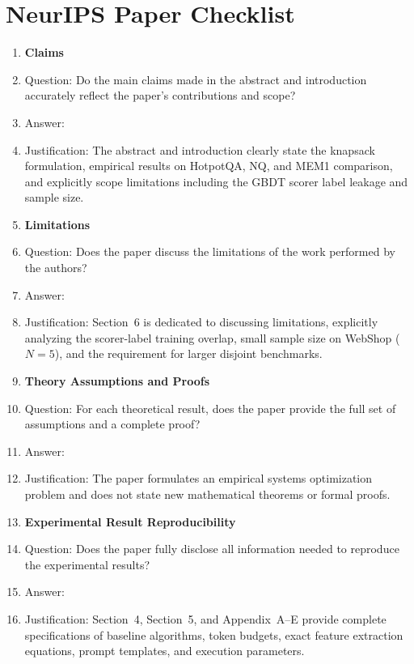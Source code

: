 \section*{NeurIPS Paper Checklist}

\begin{enumerate}

\item {\bf Claims}
    \item[] Question: Do the main claims made in the abstract and introduction accurately reflect the paper's contributions and scope?
    \item[] Answer: \answerYes{}
    \item[] Justification: The abstract and introduction clearly state the knapsack formulation, empirical results on HotpotQA, NQ, and MEM1 comparison, and explicitly scope limitations including the GBDT scorer label leakage and sample size.

\item {\bf Limitations}
    \item[] Question: Does the paper discuss the limitations of the work performed by the authors?
    \item[] Answer: \answerYes{}
    \item[] Justification: Section~6 is dedicated to discussing limitations, explicitly analyzing the scorer-label training overlap, small sample size on WebShop ($N=5$), and the requirement for larger disjoint benchmarks.

\item {\bf Theory Assumptions and Proofs}
    \item[] Question: For each theoretical result, does the paper provide the full set of assumptions and a complete proof?
    \item[] Answer: \answerNA{}
    \item[] Justification: The paper formulates an empirical systems optimization problem and does not state new mathematical theorems or formal proofs.

\item {\bf Experimental Result Reproducibility}
    \item[] Question: Does the paper fully disclose all information needed to reproduce the experimental results?
    \item[] Answer: \answerYes{}
    \item[] Justification: Section~4, Section~5, and Appendix~A--E provide complete specifications of baseline algorithms, token budgets, exact feature extraction equations, prompt templates, and execution parameters.


\end{enumerate}
